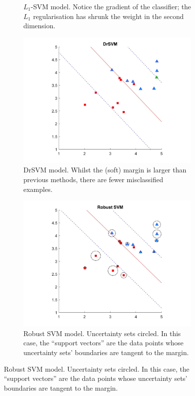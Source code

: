 \documentclass[11pt]{article}
\begin{document}
\begin{figure}[hbt!]
\begin{subfigure}{.48\textwidth}
		\caption{$L_1$-SVM model. Notice the gradient of the classifier; the $L_1$ regularisation has shrunk the weight in the second dimension.}
	\end{subfigure}
	\newline
	\begin{subfigure}{.48\textwidth}
		\centering
		\captionsetup{font=footnotesize}
		\includegraphics[width=\linewidth]{dr}
		\caption{DrSVM model. Whilst the (soft) margin is larger than previous methods, there are fewer misclassified examples. }
	\end{subfigure}
	\hfill
	\begin{subfigure}{.48\textwidth}
		\centering
		\captionsetup{font=footnotesize}
		\includegraphics[width=\linewidth]{robust}
		\caption{Robust SVM model. Uncertainty sets circled. In this case, the ``support vectors'' are the data points whose uncertainty sets' boundaries are tangent to the margin.}
	\end{subfigure}
\end{figure}
\end{document}
